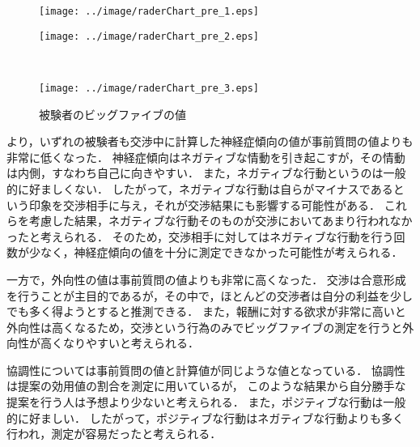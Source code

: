 \begin{figure}[bt]
    \begin{minipage}[b]{0.47\linewidth}
        \centering
        \texttt{[image: ../image/raderChart\_pre\_1.eps]}
        \label{fig:pre_big5_sub1}
    \end{minipage}
    \begin{minipage}[b]{0.47\linewidth}
        \centering
        \texttt{[image: ../image/raderChart\_pre\_2.eps]}
        \label{fig:pre_big5_sub2}
    \end{minipage}\\
    \begin{center}
        \begin{minipage}[b]{0.47\linewidth}
            \centering
            \texttt{[image: ../image/raderChart\_pre\_3.eps]}
            \label{fig:pre_big5_sub3}
        \end{minipage}
    \end{center}
    \caption{被験者のビッグファイブの値}\label{fig:pre_big5}
\end{figure}

より，いずれの被験者も交渉中に計算した神経症傾向の値が事前質問の値よりも非常に低くなった．
神経症傾向はネガティブな情動を引き起こすが，その情動は内側，すなわち自己に向きやすい．
また，ネガティブな行動というのは一般的に好ましくない．
したがって，ネガティブな行動は自らがマイナスであるという印象を交渉相手に与え，それが交渉結果にも影響する可能性がある．
これらを考慮した結果，ネガティブな行動そのものが交渉においてあまり行われなかったと考えられる．
そのため，交渉相手に対してはネガティブな行動を行う回数が少なく，神経症傾向の値を十分に測定できなかった可能性が考えられる．

一方で，外向性の値は事前質問の値よりも非常に高くなった．
交渉は合意形成を行うことが主目的であるが，その中で，ほとんどの交渉者は自分の利益を少しでも多く得ようとすると推測できる．
また，報酬に対する欲求が非常に高いと外向性は高くなるため，交渉という行為のみでビッグファイブの測定を行うと外向性が高くなりやすいと考えられる．

協調性については事前質問の値と計算値が同じような値となっている．
協調性は提案の効用値の割合を測定に用いているが，
このような結果から自分勝手な提案を行う人は予想より少ないと考えられる．
また，ポジティブな行動は一般的に好ましい．
したがって，ポジティブな行動はネガティブな行動よりも多く行われ，測定が容易だったと考えられる．

